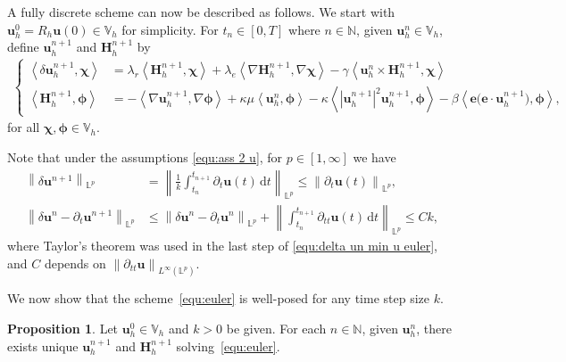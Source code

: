 \documentclass[11pt, reqno]{amsart}
\theoremstyle{definition}
\newtheorem{proposition}[theorem]{Proposition}
\theoremstyle{remark}
\numberwithin{equation}{section}
\newcommand{\bff}{\boldsymbol}
\newcommand{\bb}{\mathbb}
\newcommand{\dt}{\mathrm{d}t}
\newcommand{\norm}[2]{\left\|{#1}\right\|_{#2}}
\newcommand{\inpro}[2]{\left\langle#1,#2\right\rangle}
\newcommand{\abs}[1]{\left|{#1}\right|}
\begin{document}
A fully discrete scheme can now be described as follows. We start with $\bff{u}_h^0= R_h \bff{u}(0) \in \bb{V}_h$ for simplicity. For $t_n\in [0,T]$ where $n\in \bb{N}$, given $\bff{u}_h^n \in \bb{V}_h$, define $\bff{u}_h^{n+1}$ and $\bff{H}_h^{n+1}$ by
\begin{align}\label{equ:euler}
	\left\{
	\begin{alignedat}{1}
		\inpro{\delta \bff{u}_h^{n+1}}{\bff{\chi}}
		&=
		\lambda_r \inpro{\bff{H}_h^{n+1}}{\bff{\chi}}
		+
		\lambda_e \inpro{\nabla \bff{H}_h^{n+1}}{\nabla \bff{\chi}}
		-
		\gamma \inpro{\bff{u}_h^{n} \times \bff{H}_h^{n+1}}{\bff{\chi}}
		\\
		\inpro{\bff{H}_h^{n+1}}{\bff{\phi}} 
		&=
		-
		\inpro{\nabla \bff{u}_h^{n+1}}{\nabla \bff{\phi}}
		+
		\kappa \mu \inpro{\bff{u}_h^n}{\bff{\phi}}
		-
		\kappa \inpro{\abs{\bff{u}_h^{n+1}}^2 \bff{u}_h^{n+1}}{\bff{\phi}}
		-
		\beta \inpro{\bff{e}\big(\bff{e}\cdot \bff{u}_h^{n+1}\big)}{\bff{\phi}},
	\end{alignedat}
	\right.
\end{align}
for all $\bff{\chi}, \bff{\phi}\in \bb{V}_h$.
	
Note that under the assumptions \eqref{equ:ass 2 u}, for $p\in [1,\infty]$ we have
\begin{align}\label{equ:delta un Lp euler}
	\norm{\delta \bff{u}^{n+1}}{\bb{L}^p}
	&=
	\norm{\frac{1}{k} \int_{t_n}^{t_{n+1}} \partial_t \bff{u}(t)\, \dt}{\bb{L}^p}
	\leq 
	\norm{\partial_t \bff{u}(t)}{\bb{L}^p},
	\\
	\label{equ:delta un min u euler}
	\norm{\delta \bff{u}^n-\partial_t \bff{u}^{n+1}}{\bb{L}^p}
	&\leq
	\norm{\delta \bff{u}^n-\partial_t \bff{u}^n}{\bb{L}^p}
	+
	\norm{\int_{t_n}^{t_{n+1}} \partial_{tt}\bff{u}(t)\, \dt}{\bb{L}^p}
	\leq
	Ck,
\end{align}
where Taylor's theorem was used in the last step of \eqref{equ:delta un min u euler}, and $C$ depends on $\norm{\partial_{tt} \bff{u}}{L^\infty(\bb{L}^p)}$.

We now show that the scheme~\eqref{equ:euler} is well-posed for any time step size $k$.

\begin{proposition}\label{pro:wellpos euler}
Let $\bff{u}_h^0 \in \bb{V}_h$ and $k>0$ be given. For each $n\in \bb{N}$, given $\bff{u}_h^n$, there exists unique $\bff{u}_h^{n+1}$ and $\bff{H}_h^{n+1}$ solving~\eqref{equ:euler}.
\end{proposition}
\end{document}
